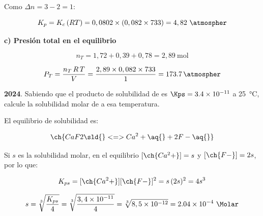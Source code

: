 \begin{exerciseEVAU}
\begin{solu}
        Como \(\Delta n = 3 - 2 = 1\):

        \begin{equation*}
            K_p = K_c\, (R T) = 0,0802 \times (0,082 \times 733) = 4,82 \ \si{\atmospher}
        \end{equation*}

        \textbf{c) Presión total en el equilibrio}

        \begin{equation*}
            n_T = 1,72 + 0,39 + 0,78 = 2,89 \ \text{mol}
        \end{equation*}

        \begin{equation*}
            P_T = \dfrac{n_T\, R\, T}{V} = \dfrac{2,89 \times 0,082 \times 733}{1} = \SI{173.7}{\atmospher}
        \end{equation*}

    \end{solu}

\end{exerciseEVAU}



\begin{exerciseEVAU}
    \textbf{2024}. Sabiendo que el producto de solubilidad de  es \( \Kps = \num{3.4e-11} \) a \SI{25}{\celsius}, calcule la solubilidad molar de  a esa temperatura.

    \begin{solu}

        El equilibrio de solubilidad es:

        \begin{equation*}
            \ch{CaF2 \sld{} <=> Ca^2+ \aq{} + 2 F- \aq{}}
        \end{equation*}

        Si \(s\) es la solubilidad molar, en el equilibrio \([\ch{Ca^2+}] = s\) y \([\ch{F-}] = 2s\), por lo que:

        \begin{equation*}
            K_{ps} = [\ch{Ca^2+}][\ch{F-}]^2 = s\, (2s)^2 = 4 s^3
        \end{equation*}

        \begin{equation*}
            s = \sqrt[3]{\dfrac{K_{ps}}{4}} = \sqrt[3]{\dfrac{3,4 \times 10^{-11}}{4}} = \sqrt[3]{8,5 \times 10^{-12}} = \num{2.04e-4} \ \si{\Molar}
        \end{equation*}

    \end{solu}
\end{exerciseEVAU}

